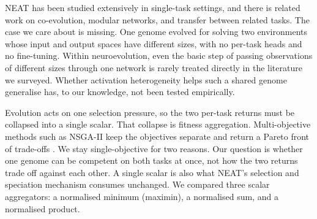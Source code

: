 % 

NEAT has been studied extensively in single-task settings, and there is related work on co-evolution, modular networks, and transfer between related tasks.
The case we care about is missing. One genome evolved for solving two environments whose input and output spaces have different sizes, with no per-task heads and no fine-tuning.
Within neuroevolution, even the basic step of passing observations of different sizes through one network is rarely treated directly in the literature we surveyed.
Whether activation heterogeneity helps such a shared genome generalise has, to our knowledge, not been tested empirically.

Evolution acts on one selection pressure, so the two per-task returns must be collapsed into a single scalar. That collapse is fitness aggregation.
Multi-objective methods such as NSGA-II keep the objectives separate and return a Pareto front of trade-offs \parencite{deb_fast_2002}.
We stay single-objective for two reasons. Our question is whether one genome can be competent on both tasks at once, not how the two returns trade off against each other. A single scalar is also what NEAT's selection and speciation mechanism consumes unchanged.
We compared three scalar aggregators: a normalised minimum (maximin), a normalised sum, and a normalised product.



